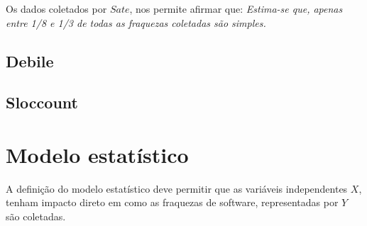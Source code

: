 Os dados coletados por $Sate$, nos permite afirmar que: \emph{Estima-se que, apenas entre 1/8 e 1/3  de todas as fraquezas coletadas são simples.}

\subsection{Debile}

\subsection{Sloccount}


\section{Modelo estatístico}

A definição do modelo estatístico deve permitir que as variáveis independentes $X$, tenham impacto direto em
como as fraquezas de software, representadas por $Y$ são coletadas.
